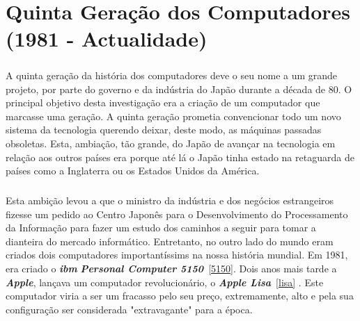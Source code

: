 \documentclass{report}
\begin{document}
\chapter{Quinta Geração dos Computadores (1981 - Actualidade)}
\label{chap:IA}
\paragraph{}
A quinta geração\cite{quintageracao} da história dos computadores deve o seu nome a um grande projeto, por parte do governo e da indústria do Japão durante a década de 80. O principal objetivo desta investigação era a criação de um computador que marcasse uma geração. A quinta geração prometia convencionar todo um novo sistema da tecnologia querendo deixar, deste modo, as máquinas passadas obsoletas. Esta, ambiação, tão grande,  do Japão de avançar na tecnologia em relação aos outros países era porque até lá o Japão tinha estado na retaguarda de países como a Inglaterra ou os Estados Unidos da América.
\paragraph{}
Esta ambição levou a que o ministro da indústria e dos negócios estrangeiros fizesse um pedido ao Centro Japonês para o Desenvolvimento do Processamento da Informação para fazer um estudo dos caminhos a seguir para tomar a dianteira do mercado informático.
Entretanto, no outro lado do mundo eram criados dois computadores importantíssims na nossa história mundial. Em 1981, era criado o \textbf{\textit{\acs{ibm}}} \textbf{\textit{Personal Computer 5150}}~\ref{5150}. Dois anos mais tarde a \textbf{\textit{Apple}}, lançava um computador revolucionário, o \textbf{\textit{Apple Lisa}}~\ref{lisa} . Este computador viria a ser um fracasso pelo seu preço, extremamente, alto e pela sua configuração ser considerada "extravagante" para a época. 
			
\end{document}
